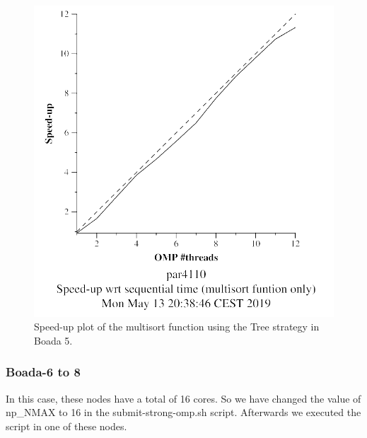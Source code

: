 \documentclass[12pt, a4paper]{article}
\begin{document}
\begin{figure}[H]
\begin{minipage}[b]{0.4\linewidth}
  \includegraphics[scale=0.5]{./S2/multisort-omp-strong_boada-5_tree_multisort_only}
  \caption{Speed-up plot of the multisort function using the Tree strategy in Boada 5.}
  \label{fig:mandel-omp-10000-strong-21-speedup}
\end{minipage}
\end{figure}

\subsubsection{Boada-6 to 8}

In this case, these nodes have a total of 16 cores. So we have changed the value of np\_NMAX to 16 in the submit-strong-omp.sh script. Afterwards we executed the script in one of these nodes.
\end{document}
